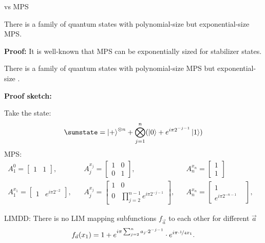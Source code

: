 \begin{frame}{\limdd vs MPS}


\begin{lemma}
	There is a family of quantum states with polynomial-size \limdd but exponential-size MPS.
\end{lemma}

\vspace{-.5em}

\textbf{Proof:} It is well-known that MPS can be exponentially sized for stabilizer states.


\vspace{.5em}

\pause


\begin{lemma}
	There is a family of quantum states with polynomial-size MPS but exponential-size \limdd.
\end{lemma}


\vspace{-.5em}
\textbf{Proof sketch:} 

Take the state: \vspace{-2.5em}
\begin{align}
\sumstate = \ket{+}^{\otimes n} + \bigotimes_{j=1}^n(\ket 0+e^{i\pi 2^{-j-1}}\ket 1)
\end{align}
MPS: \vspace{-2.5em}
\begin{align*}
	    A^{0}_1 = \begin{bmatrix} 1 & 1\end{bmatrix}, ~~~~  &A^{x_j}_j = \begin{bmatrix} 1 &  0 \\ 0 & 1 \end{bmatrix}, ~~~~~~ &&A^{x_n}_n = \begin{bmatrix} 1 \\ 1\end{bmatrix}&\\
	    A^{x_1}_1 = \begin{bmatrix} 1 & e^{i\pi 2^{-2}}\end{bmatrix}, ~~~~  &A^{x_j}_j = \begin{bmatrix} 1 &  0 \\ 0 & \prod_{j=2}^{n-1}e^{i\pi 2^{-j-1}}\end{bmatrix},  && A^{x_n}_n = \begin{bmatrix} 1 \\ e^{i\pi 2^{-n-1}}&\end{bmatrix},
	\end{align*}	

LIMDD: There is no LIM mapping subfunctions $f_{\vec a}$ 
to each other for different ${\vec a}$
\[
f_{\vec a}(x_1) = 1 + e^{i\pi \sum_{j=2}^n a_j \cdot 2^{-j-1}} \cdot
e^{i\pi \cdot \nicefrac14 x_1 }.
\]

\end{frame}



